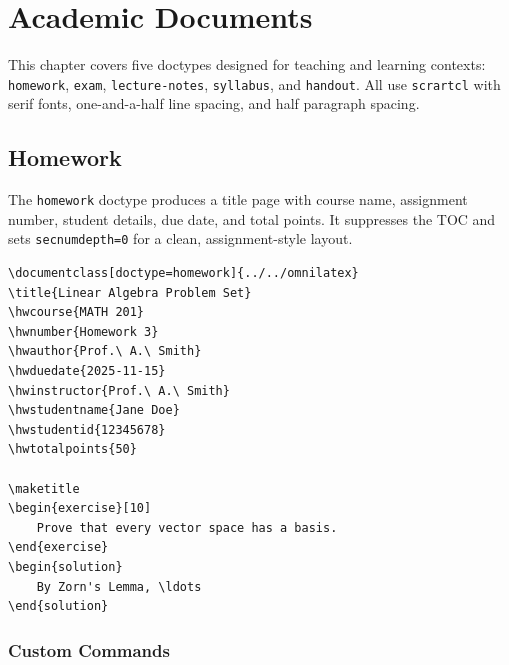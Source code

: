 \chapter{Academic Documents}
\label{ch:academic}

This chapter covers five doctypes designed for teaching and learning
contexts: \texttt{homework}, \texttt{exam}, \texttt{lecture-notes},
\texttt{syllabus}, and \texttt{handout}.  All use \texttt{scrartcl} with
serif fonts, one-and-a-half line spacing, and half paragraph spacing.

\section{Homework}
\label{sec:homework}

The \texttt{homework} doctype produces a title page with course name,
assignment number, student details, due date, and total points.
It suppresses the TOC and sets \texttt{secnumdepth=0} for a clean,
assignment-style layout.

\begin{verbatim}
\documentclass[doctype=homework]{../../omnilatex}
\title{Linear Algebra Problem Set}
\hwcourse{MATH 201}
\hwnumber{Homework 3}
\hwauthor{Prof.\ A.\ Smith}
\hwduedate{2025-11-15}
\hwinstructor{Prof.\ A.\ Smith}
\hwstudentname{Jane Doe}
\hwstudentid{12345678}
\hwtotalpoints{50}

\maketitle
\begin{exercise}[10]
    Prove that every vector space has a basis.
\end{exercise}
\begin{solution}
    By Zorn's Lemma, \ldots
\end{solution}

\end{verbatim}

\subsection{Custom Commands}

